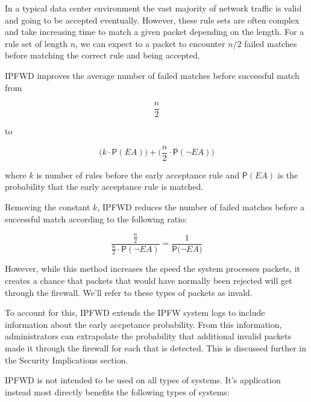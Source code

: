 \documentclass[journal]{IEEEtran}
\begin{document}
In a typical data center environment the vast majority of network traffic is
valid and going to be accepted eventually. However, these rule sets are often
complex and take increasing time to match a given packet depending on the
length. For a rule set of length $n$, we can expect to a packet to encounter
$n/2$ failed matches before matching the correct rule and being accepted.

IPFWD improves the average number of failed matches before successful match
from

\[
\frac{n}{2}
\]

to

\[
\Big(k \cdot \mathsf{P}(\textit{EA})\Big) + 
\Big(\frac{n}{2} \cdot \mathsf{P}(\neg{\textit{EA}})\Big) 
\]

where $k$ is number of rules before the early acceptance rule and
$\mathsf{P}(\textit{EA})$ is the probability that the early acceptance rule is
matched.

Removing the constant $k$, IPFWD reduces the number of failed matches before a
successful match according to the following ratio:

\[
\frac
    {\frac{n}{2}}
    {\frac{n}{2} \cdot \mathsf{P}(\neg{\textit{EA}})} 
= \frac{1}{\mathsf{P}(\neg{\textit{EA})}}
\]

However, while this method increases the speed the system processes packets, it
creates a chance that packets that would have normally been rejected will get
through the firewall. We'll refer to these types of packets as invald.

To account for this, IPFWD extends the IPFW system logs to include information
about the early accpetance probability. From this information, administrators
can extrapolate the probability that additional invalid packets made it through
the firewall for each that is detected. This is discussed further in the
Security Implications section.

IPFWD is not intended to be used on all types of systems. It's application
instead most directly benefits the following types of systems:
\end{document}
